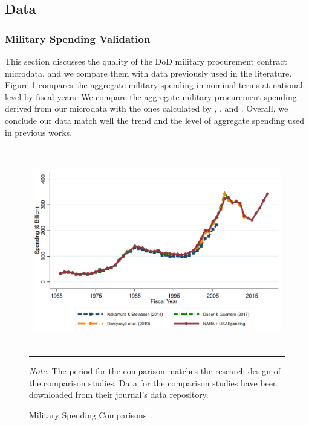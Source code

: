 \documentclass[dv_diss_main.tex]{subfiles}
\begin{document}
\subsection{Data}

\subsubsection{Military Spending Validation}
\label{sec:app_data}

This section discusses the quality of the DoD military procurement contract microdata, and we compare them with data previously used in the literature. Figure \ref{fig:spend_comparison} compares the aggregate military spending in nominal terms at national level by fiscal years. We compare the aggregate military procurement spending derived from our microdata with the ones calculated by \cite{Nakamura2014}, \cite{Dupor2017}, and \cite{Demyanyk2019}. Overall, we conclude our data match well the trend and the level of aggregate spending used in previous works. 

\begin{figure}[ht]
    \begin{center}
       \begin{tabular}[c]{c}
    
    {\includegraphics[height=3.5in,width=5.5in]{figures/graph_milspend_comparison.png}} \\[0.1in]

    
    \end{tabular}
    \caption{Military Spending Comparisons}\label{fig:spend_comparison}
    \end{center}
    
   
    \footnotesize{\textit{Note.} The period for the comparison matches the research design of the comparison studies. Data for the comparison studies have been downloaded from their journal's data repository.}
    
\end{figure}
\end{document}
